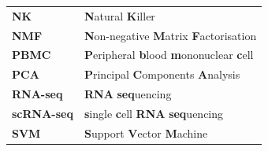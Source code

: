 \documentclass[12pt,]{book}
\theoremstyle{definition}
\theoremstyle{definition}
\theoremstyle{definition}
\theoremstyle{remark}
\begin{document}
\begin{longtable}[]{@{}ll@{}}
\begin{minipage}[t]{0.13\columnwidth}\raggedright
\textbf{NK}\strut
\end{minipage} & \begin{minipage}[t]{0.81\columnwidth}\raggedright
\textbf{N}atural \textbf{K}iller\strut
\end{minipage}\tabularnewline
\begin{minipage}[t]{0.13\columnwidth}\raggedright
\textbf{NMF}\strut
\end{minipage} & \begin{minipage}[t]{0.81\columnwidth}\raggedright
\textbf{N}on-negative \textbf{M}atrix \textbf{F}actorisation\strut
\end{minipage}\tabularnewline
\begin{minipage}[t]{0.13\columnwidth}\raggedright
\textbf{PBMC}\strut
\end{minipage} & \begin{minipage}[t]{0.81\columnwidth}\raggedright
\textbf{P}eripheral \textbf{b}lood \textbf{m}ononuclear
\textbf{c}ell\strut
\end{minipage}\tabularnewline
\begin{minipage}[t]{0.13\columnwidth}\raggedright
\textbf{PCA}\strut
\end{minipage} & \begin{minipage}[t]{0.81\columnwidth}\raggedright
\textbf{P}rincipal \textbf{C}omponents \textbf{A}nalysis\strut
\end{minipage}\tabularnewline
\begin{minipage}[t]{0.13\columnwidth}\raggedright
\textbf{RNA-seq}\strut
\end{minipage} & \begin{minipage}[t]{0.81\columnwidth}\raggedright
\textbf{RNA} \textbf{seq}uencing\strut
\end{minipage}\tabularnewline
\begin{minipage}[t]{0.13\columnwidth}\raggedright
\textbf{scRNA-seq}\strut
\end{minipage} & \begin{minipage}[t]{0.81\columnwidth}\raggedright
\textbf{s}ingle \textbf{c}ell \textbf{RNA} \textbf{seq}uencing\strut
\end{minipage}\tabularnewline
\begin{minipage}[t]{0.13\columnwidth}\raggedright
\textbf{SVM}\strut
\end{minipage} & \begin{minipage}[t]{0.81\columnwidth}\raggedright
\textbf{S}upport \textbf{V}ector \textbf{M}achine\strut

\end{minipage}
\end{longtable}
\end{document}
